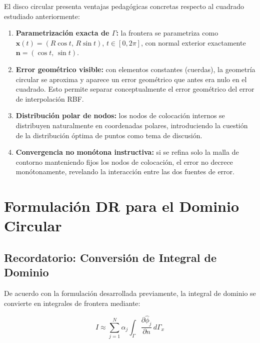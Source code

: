 \documentclass[12pt,a4paper]{article}
\begin{document}
El disco circular presenta ventajas pedagógicas concretas respecto al
cuadrado estudiado anteriormente:

\begin{enumerate}
    \item \textbf{Parametrización exacta de $\Gamma$:} la frontera se
    parametriza como $\mathbf{x}(t) = (R\cos t,\, R\sin t)$, $t\in[0,2\pi]$,
    con normal exterior exactamente $\mathbf{n} = (\cos t,\, \sin t)$.

    \item \textbf{Error geométrico visible:} con elementos constantes
    (cuerdas), la geometría circular se aproxima y aparece un error
    geométrico que antes era nulo en el cuadrado. Esto permite separar
    conceptualmente el error geométrico del error de interpolación RBF.

    \item \textbf{Distribución polar de nodos:} los nodos de colocación
    internos se distribuyen naturalmente en coordenadas polares, introduciendo
    la cuestión de la distribución óptima de puntos como tema de discusión.

    \item \textbf{Convergencia no monótona instructiva:} si se refina solo la
    malla de contorno manteniendo fijos los nodos de colocación, el error
    no decrece monótonamente, revelando la interacción entre las dos fuentes
    de error.
\end{enumerate}

\section{Formulación DR para el Dominio Circular}

\subsection{Recordatorio: Conversión de Integral de Dominio}

De acuerdo con la formulación desarrollada previamente, la integral de
dominio se convierte en integrales de frontera mediante:

\begin{equation}
    I \approx \sum_{j=1}^{N} \alpha_j \int_\Gamma
    \frac{\partial\hat{\phi}_j}{\partial n}\, d\Gamma_x
\end{equation}
\end{document}
